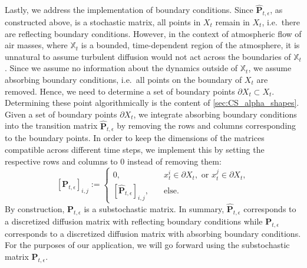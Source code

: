 Lastly, we address the implementation of boundary conditions. Since $\hat{\mathbf{P}}_{t,\epsilon}$, as constructed above, is a stochastic matrix, all points in $X_t$ remain in $X_t$, i.e.~there are reflecting boundary conditions. However, in the context of atmospheric flow of air masses, where $\mathbb{X}_t$ is a bounded, time-dependent region of the atmosphere, it is unnatural to assume turbulent diffusion would not act across the boundaries of $\mathbb{X}_t$. Since we assume no information about the dynamics outside of $\mathbb{X}_t$, we assume absorbing boundary conditions, i.e.~all points on the boundary of $X_t$ are removed. Hence, we need to determine a set of boundary points $\partial X_t \subset X_t$. Determining these point algorithmically is the content of \cref{sec:CS_alpha_shapes}. Given a set of boundary points $\partial X_t$, we integrate absorbing boundary conditions into the transition matrix $\hat{\mathbf{P}}_{t,\epsilon}$ by removing the rows and columns corresponding to the boundary points. In order to keep the dimensions of the matrices compatible across different time steps, we implement this by setting the respective rows and columns to $0$ instead of removing them:
\begin{equation}
    \left[\mathbf{P}_{t, \epsilon}\right]_{i, j} := \begin{cases}
        0,                                                        & x_t^i \in \partial X_t, \text{ or } x_t^j\in \partial X_t, \\
        \left[\hat{\mathbf{P}}_{t, \epsilon}\right]_{i, j}, \quad & \text{else}.
    \end{cases}
\end{equation}
By construction, $\mathbf{P}_{t, \epsilon}$ is a substochastic matrix. In summary, $\hat{\mathbf{P}}_{t, \epsilon}$ corresponds to a discretized diffusion matrix with reflecting boundary conditions while $\mathbf{P}_{t, \epsilon}$ corresponds to a discretized diffusion matrix with absorbing boundary conditions. For the purposes of our application, we will go forward using the substochastic matrix $\mathbf{P}_{t, \epsilon}$.

